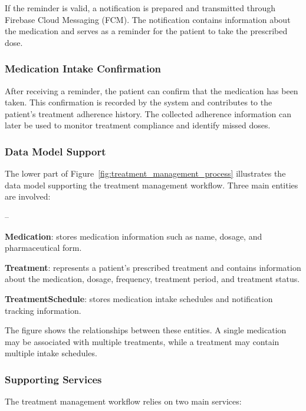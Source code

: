 If the reminder is valid, a notification is prepared and transmitted through Firebase Cloud Messaging (FCM). The notification contains information about the medication and serves as a reminder for the patient to take the prescribed dose.

\subsubsection{Medication Intake Confirmation}

After receiving a reminder, the patient can confirm that the medication has been taken. This confirmation is recorded by the system and contributes to the patient's treatment adherence history. The collected adherence information can later be used to monitor treatment compliance and identify missed doses.

\subsubsection{Data Model Support}

The lower part of Figure~\ref{fig:treatment_management_process} illustrates the data model supporting the treatment management workflow. Three main entities are involved:

\begin{list}{--}{}
 \setlength\itemsep{-0.5em}
    \item \textbf{Medication}: stores medication information such as name, dosage, and pharmaceutical form.

    \item \textbf{Treatment}: represents a patient's prescribed treatment and contains information about the medication, dosage, frequency, treatment period, and treatment status.

    \item \textbf{TreatmentSchedule}: stores medication intake schedules and notification tracking information.
\end{list}

The figure shows the relationships between these entities. A single medication may be associated with multiple treatments, while a treatment may contain multiple intake schedules.

\subsubsection{Supporting Services}

The treatment management workflow relies on two main services:

